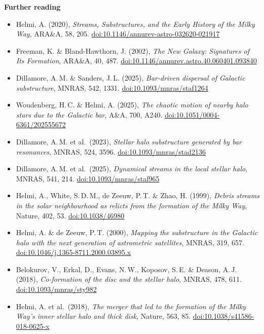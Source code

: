 \documentclass[11pt,a4paper]{article}
\begin{document}
\vspace{0.5em}
{\small\raggedright
\textbf{Further reading}
\begin{itemize}[leftmargin=1.2em,itemsep=0.1em,parsep=0pt,topsep=0.3em]
\item Helmi, A. (2020), \emph{Streams, Substructures, and the Early History of the Milky Way}, ARA\&A, 58, 205. \href{https://doi.org/10.1146/annurev-astro-032620-021917}{doi:10.1146/annurev-astro-032620-021917}
\item Freeman, K. \& Bland-Hawthorn, J. (2002), \emph{The New Galaxy: Signatures of Its Formation}, ARA\&A, 40, 487. \href{https://doi.org/10.1146/annurev.astro.40.060401.093840}{doi:10.1146/annurev.astro.40.060401.093840}
\item Dillamore, A.\,M. \& Sanders, J.\,L. (2025), \emph{Bar-driven dispersal of Galactic substructure}, MNRAS, 542, 1331. \href{https://doi.org/10.1093/mnras/staf1264}{doi:10.1093/mnras/staf1264}
\item Woudenberg, H.\,C. \& Helmi, A. (2025), \emph{The chaotic motion of nearby halo stars due to the Galactic bar}, A\&A, 700, A240. \href{https://doi.org/10.1051/0004-6361/202555672}{doi:10.1051/0004-6361/202555672}
\item Dillamore, A.\,M. et al.\ (2023), \emph{Stellar halo substructure generated by bar resonances}, MNRAS, 524, 3596. \href{https://doi.org/10.1093/mnras/stad2136}{doi:10.1093/mnras/stad2136}
\item Dillamore, A.\,M. et al.\ (2025), \emph{Dynamical streams in the local stellar halo}, MNRAS, 541, 214. \href{https://doi.org/10.1093/mnras/staf965}{doi:10.1093/mnras/staf965}
\item Helmi, A., White, S.\,D.\,M., de Zeeuw, P.\,T. \& Zhao, H. (1999), \emph{Debris streams in the solar neighbourhood as relicts from the formation of the Milky Way}, Nature, 402, 53. \href{https://doi.org/10.1038/46980}{doi:10.1038/46980}
\item Helmi, A. \& de Zeeuw, P.\,T. (2000), \emph{Mapping the substructure in the Galactic halo with the next generation of astrometric satellites}, MNRAS, 319, 657. \href{https://doi.org/10.1046/j.1365-8711.2000.03895.x}{doi:10.1046/j.1365-8711.2000.03895.x}
\item Belokurov, V., Erkal, D., Evans, N.\,W., Koposov, S.\,E. \& Deason, A.\,J. (2018), \emph{Co-formation of the disc and the stellar halo}, MNRAS, 478, 611. \href{https://doi.org/10.1093/mnras/sty982}{doi:10.1093/mnras/sty982}
\item Helmi, A. et al.\ (2018), \emph{The merger that led to the formation of the Milky Way's inner stellar halo and thick disk}, Nature, 563, 85. \href{https://doi.org/10.1038/s41586-018-0625-x}{doi:10.1038/s41586-018-0625-x}

\end{itemize}}
\end{document}
